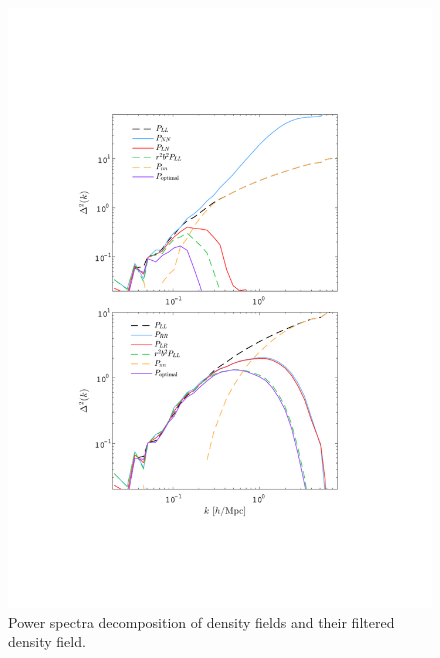 \documentclass[aps,prd,twocolumn,superscriptaddress,amsfont,amssymb,amsmath,nofootinbib,showpacs,balancelastpage]{revtex4-1}
\begin{document}
\begin{figure}[t] \centering
  \includegraphics[width=1.0\linewidth]{recopower.pdf}
  \caption{Power spectra decomposition of density fields and their
  filtered density field.}
  \label{fig.recopower}
\end{figure}
\end{document}
